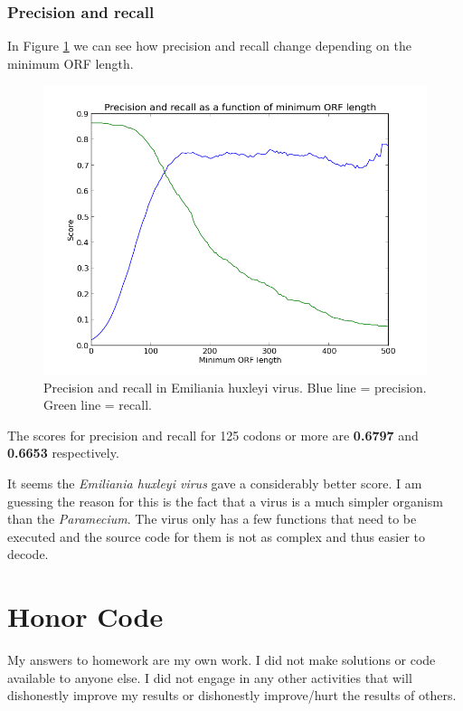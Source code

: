 \documentclass[a4paper,11pt]{article}
\begin{document}
\subsubsection{Precision and recall}
In Figure \ref{precrec2} we can see how precision and recall change depending on the minimum ORF length.
\begin{figure}[h!]
\begin{center}
\includegraphics[scale=0.65]{precision-recall2.png}
\caption{Precision and recall in Emiliania huxleyi virus. Blue line = precision. Green line = recall.}
\label{precrec2}
\end{center}
\end{figure}
The scores for precision and recall for 125 codons or more are \textbf{0.6797} and \textbf{0.6653} respectively. 

It seems the \textit{Emiliania huxleyi virus} gave a considerably better score. I am guessing the reason for this is the fact that a virus is a much simpler organism than the \textit{Paramecium}. The virus only has a few functions that need to be executed and the source code for them is not as complex and thus easier to decode.
\section*{Honor Code}


My answers to homework are my own work. I did not make solutions or code available to anyone else. I did not engage in any other activities that will dishonestly improve my results or dishonestly improve/hurt the results of others.
\end{document}

